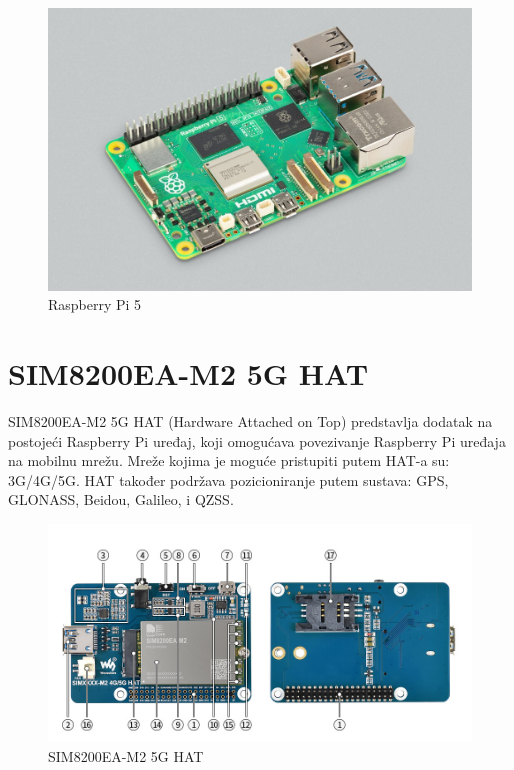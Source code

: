 \documentclass[zavrsnirad]{fer}
\begin{document}
\vspace{1em}

\begin{figure}[htb]
  \centering
  \includegraphics[width=0.8\linewidth]{Figures/RaspberryPi5.jpg} 
  \caption{Raspberry Pi 5 \cite{EbenUpton}}
  \label{slk:raspberrypi5}
\end{figure}

\pagebreak

\section{SIM8200EA-M2 5G HAT}
\label{dio:sim8200ea}

SIM8200EA-M2 5G HAT (Hardware Attached on Top) predstavlja dodatak na postojeći Raspberry Pi uređaj, koji omogućava
povezivanje Raspberry Pi uređaja na mobilnu mrežu. Mreže kojima je moguće pristupiti putem HAT-a su: 3G/4G/5G. HAT također
podržava pozicioniranje putem sustava: GPS, GLONASS, Beidou, Galileo, i QZSS.

\begin{figure}[htb]
  \centering
  \includegraphics[width=1\linewidth]{Figures/SIM8200EA-M2-5G-HAT-details-intro.jpg} 
  \caption{SIM8200EA-M2 5G HAT \cite{Waveshare}}
  \label{slk:wavesharesim8200}
\end{figure}
\end{document}
